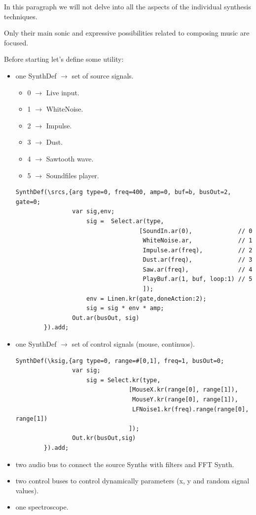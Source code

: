 In this paragraph we will not delve into all the aspects of the individual synthesis techniques.

Only their main sonic and expressive possibilities related to composing music are focused.

Before starting let's define some utility:

\begin{itemize}
\tightlist
\item one SynthDef \(\rightarrow\) set of source signals. 
  \begin{itemize}
  \tightlist
  \item 0 \(\rightarrow\) Live input.
  \item 1 \(\rightarrow\) WhiteNoise.
  \item 2 \(\rightarrow\) Impulse.
  \item 3 \(\rightarrow\) Dust.
  \item 4 \(\rightarrow\) Sawtooth wave.
  \item 5 \(\rightarrow\) Soundfiles player.
  \end{itemize}

  \begin{lstlisting}[frame=single, caption=Source signals model, label=sources] 
SynthDef(\srcs,{arg type=0, freq=400, amp=0, buf=b, busOut=2, gate=0;
                var sig,env;
                    sig =  Select.ar(type,
                                   [SoundIn.ar(0),             // 0
                                    WhiteNoise.ar,             // 1
                                    Impulse.ar(freq),          // 2
                                    Dust.ar(freq),             // 3
                                    Saw.ar(freq),              // 4
                                    PlayBuf.ar(1, buf, loop:1) // 5
                                    ]);
	                env = Linen.kr(gate,doneAction:2);
	                sig = sig * env * amp;
	            Out.ar(busOut, sig)
        }).add;
  \end{lstlisting}

\item one SynthDef \(\rightarrow\) set of control signals (mouse, continuos). 
  \begin{lstlisting}[frame=single] 
SynthDef(\ksig,{arg type=0, range=#[0,1], freq=1, busOut=0;
	            var sig;
	                sig = Select.kr(type,
                                [MouseX.kr(range[0], range[1]),
                                 MouseY.kr(range[0], range[1]),
                                 LFNoise1.kr(freq).range(range[0], range[1])
                                ]);
	            Out.kr(busOut,sig)
        }).add;
  \end{lstlisting}
\item two audio bus to connect the source Synths with filters and FFT Synth. 
\item two control buses to control dynamically parameters (x, y and random signal values). 
\item one spectroscope.


\end{itemize}
